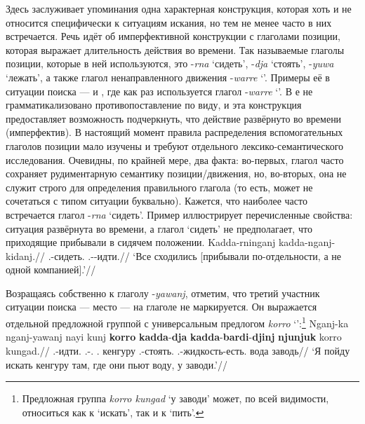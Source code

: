 Здесь заслуживает упоминания одна характерная конструкция, которая хоть и не относится специфически к ситуациям искания, но тем не менее часто в них встречается. Речь идёт об имперфективной конструкции с глаголами позиции, которая выражает длительность действия во времени. Так называемые глаголы позиции, которые в ней используются, это -\textit{rna} `сидеть', -\textit{dja} `стоять', -\textit{yuwa} `лежать', а также глагол ненаправленного движения -\textit{warre} `\warre'. Примеры её в ситуации поиска ---  и , где как раз используется глагол -\textit{warre} `\warre'. В  е не грамматикализовано противопоставление по виду, и эта конструкция предоставляет возможность подчеркнуть, что действие развёрнуто во времени (имперфектив). В настоящий момент правила распределения вспомогательных глаголов позиции мало изучены и требуют отдельного лексико-семантического исследования. Очевидны, по крайней мере, два факта: во-первых, глагол часто сохраняет рудиментарную семантику позиции/движения, но, во-вторых, она не служит строго для определения правильного глагола (то есть, может не сочетаться с типом ситуации буквально). Кажется, что наиболее часто встречается глагол -\textit{rna} `сидеть'. Пример  иллюстрирует перечисленные свойства: ситуация развёрнута во времени, а глагол `сидеть' не предполагает, что приходящие прибывали в сидячем положении.
\begingl
\gla Kadda-rninganj kadda-nganj-kidanj.//
\glb \Tpl.\Real-сидеть.\Pst{} \Tpl.\Real-\Hith-идти.\Pst{}//
\glft `Все сходились [прибывали по-отдельности, а не одной компанией].'//%
\endgl\xe

Возращаясь собственно к глаголу -\textit{yawanj}, отметим, что третий участник ситуации поиска --- место --- на глаголе не маркируется. Он выражается отдельной предложной группой с универсальным предлогом \textit{korro} `\korro':\footnote{Предложная группа \textit{korro kungad} `у заводи' может, по всей видимости, относиться как к `искать', так и к `пить'.}
\begingl
\gla Nganj-ka nganj-yawanj nayi kunj \textbf{korro} \textbf{kadda}-\textbf{dja} \textbf{kadda}-\textbf{bardi}-\textbf{djinj} \textbf{njunjuk} korro kungad.//
\glb \Fsg.\Fut-идти.\Np{} \Fsg.\Fut-\yaw.\Np{} \Nm.\Cli{} кенгуру \korro{} \Tpl.\Real-стоять.\Np{} \Tpl.\Real-жидкость-есть.\Np{} вода \korro{} заводь//
\glft `Я пойду искать кенгуру там, где они пьют воду, у заводи.'//%
\endgl\xe

